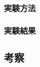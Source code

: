 \documentclass[./main]{subfiles}
\begin{document}
\subsubsection{実験方法}
\label{subsubsec: coilcurrent_exp-exp2-method}

\subsubsection{実験結果}
\label{subsubsec: coilcurrent_exp-exp2-result}

\subsection{考察}
\label{subsec: coilcurrent_exp-consideration}

\biblio
\end{document}
